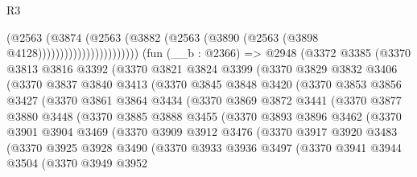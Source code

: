\begin{lexlean}{R3}
\begin{coremodule}
                                  (@2563
                                    (@3874
                                      (@2563
                                        (@3882
                                          (@2563 (@3890 (@2563 (@3898 @4128)))))))))))))))))))))))
    (fun (__b : @2366) =>
    @2948
      (@3372
        @3385
        (@3370
          @3813
          @3816
          @3392
          (@3370
            @3821
            @3824
            @3399
            (@3370
              @3829
              @3832
              @3406
              (@3370
                @3837
                @3840
                @3413
                (@3370
                  @3845
                  @3848
                  @3420
                  (@3370
                    @3853
                    @3856
                    @3427
                    (@3370
                      @3861
                      @3864
                      @3434
                      (@3370
                        @3869
                        @3872
                        @3441
                        (@3370
                          @3877
                          @3880
                          @3448
                          (@3370
                            @3885
                            @3888
                            @3455
                            (@3370
                              @3893
                              @3896
                              @3462
                              (@3370
                                @3901
                                @3904
                                @3469
                                (@3370
                                  @3909
                                  @3912
                                  @3476
                                  (@3370
                                    @3917
                                    @3920
                                    @3483
                                    (@3370
                                      @3925
                                      @3928
                                      @3490
                                      (@3370
                                        @3933
                                        @3936
                                        @3497
                                        (@3370
                                          @3941
                                          @3944
                                          @3504
                                          (@3370
                                            @3949
                                            @3952

\end{coremodule}
\end{lexlean}
